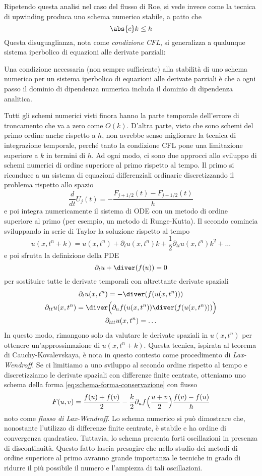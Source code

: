 Ripetendo questa analisi nel caso del flusso di Roe, si vede invece come
la tecnica di upwinding produca uno schema numerico stabile, a patto che
\[
\abs{c}k \leq h
\]
Questa disuguaglianza, nota come \emph{condizione CFL}, si generalizza
a qualunque sistema iperbolico di equazioni alle derivate parziali:

\begin{prop}
Una condizione necessaria (non sempre sufficiente) alla stabilità
di uno schema numerico per un sistema iperbolico di equazioni alle derivate parziali
è che a ogni passo il dominio di dipendenza numerica
includa il dominio di dipendenza analitica.
\end{prop}

\noindent Tutti gli schemi numerici visti finora hanno la parte temporale
dell'errore di troncamento che va a zero come $O(k)$. D'altra parte, visto
che sono schemi del primo ordine anche rispetto a $h$, non avrebbe senso
migliorare la tecnica di integrazione temporale, perché tanto
la condizione CFL pone una limitazione superiore a $k$ in termini di $h$.
Ad ogni modo, ci sono due approcci allo sviluppo di schemi numerici
di ordine superiore al primo rispetto al tempo.
Il primo si riconduce a un sistema di equazioni differenziali
ordinarie discretizzando il problema rispetto allo spazio
\[
\frac{d}{dt} U_j(t) = - \frac{F_{j+1/2}(t) - F_{j-1/2}(t)}{h}
\]
e poi integra numericamente il sistema di ODE con un metodo di ordine superiore
al primo (per esempio, un metodo di Runge-Kutta).
Il secondo comincia sviluppando in serie di Taylor la soluzione rispetto al tempo
\[
u(x,t^{n}+k)
= u(x,t^{n})
+ \partial_t u(x,t^n) k
+ \frac{1}{2} \partial_{tt} u(x,t^n) k^2
+ \dots
\]
e poi sfrutta la definizione della PDE
\[
\partial_t u + \diver(f(u)) = 0
\]
per sostituire tutte le derivate temporali con altrettante derivate spaziali
\begin{gather*}
\partial_t u(x,t^n) = -\diver(f(u(x,t^n))) \\
\partial_{tt} u(x,t^n) = \diver\Bigl( \partial_u f(u(x,t^n)) \diver(f(u(x,t^n))) \Bigr) \\
\partial_{ttt} u(x,t^n) = \dots
\end{gather*}
In questo modo, rimangono solo da valutare le derivate spaziali in
$u(x,t^n)$ per ottenere un'approssimazione di $u(x,t^{n}+k)$.
Questa tecnica, ispirata al teorema di Cauchy-Kovalevskaya, è nota in questo
contesto come procedimento di \emph{Lax-Wendroff}.
Se ci limitiamo a uno sviluppo al secondo ordine rispetto al tempo e discretizziamo
le derivate spaziali con differenze finite centrate, otteniamo uno schema
della forma \eqref{eq:schema-forma-conservazione} con flusso
\[
F(u,v) = \frac{f(u)+f(v)}{2}
       - \frac{k}{2} \partial_u f \Bigl( \frac{u+v}{2} \Bigr) \frac{f(v)-f(u)}{h}
\]
noto come \emph{flusso di Lax-Wendroff}. Lo schema numerico si può dimostrare
che, nonostante l'utilizzo di differenze finite centrate, è stabile
e ha ordine di convergenza quadratico. Tuttavia, lo schema presenta
forti oscillazioni in presenza di discontinuità.
Questo fatto lascia presagire che nello studio dei metodi di ordine
superiore al primo avranno grande importanza le tecniche in grado
di ridurre il più possibile il numero e l'ampiezza di tali oscillazioni.

